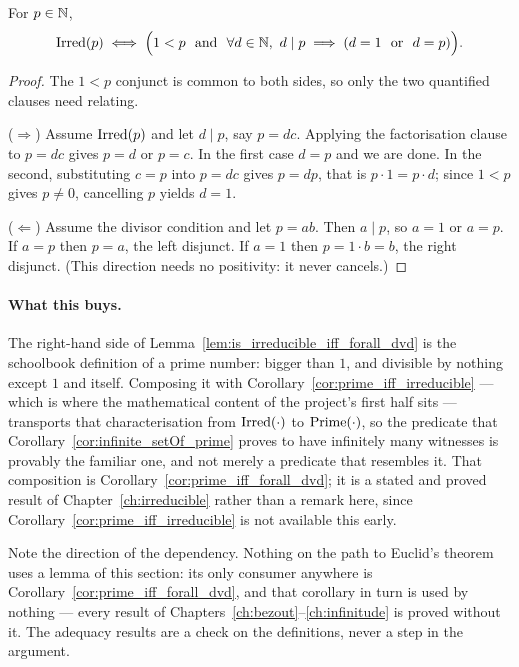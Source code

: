 \begin{lemma}
  \leanok
  \label{lem:is_irreducible_iff_forall_dvd}
  For $p \in \mathbb{N}$,
  \[
    \Irr{p} \iff \Bigl(1 < p \ \text{ and }\ \forall d \in \NN,\
      d \mid p \implies (d = 1 \ \text{ or }\ d = p)\Bigr).
  \]
\end{lemma}
\begin{proof}
  \leanok
  The $1 < p$ conjunct is common to both sides, so only the two quantified
  clauses need relating.

  ($\Rightarrow$) Assume $\mathrm{Irred}(p)$ and let $d \mid p$, say $p = dc$. Applying
  the factorisation clause to $p = dc$ gives $p = d$ or $p = c$. In the first
  case $d = p$ and we are done. In the second, substituting $c = p$ into
  $p = dc$ gives $p = dp$, that is $p \cdot 1 = p \cdot d$; since $1 < p$ gives
  $p \neq 0$, cancelling $p$ yields $d = 1$.

  ($\Leftarrow$) Assume the divisor condition and let $p = ab$. Then $a \mid p$,
  so $a = 1$ or $a = p$. If $a = p$ then $p = a$, the left disjunct. If $a = 1$
  then $p = 1 \cdot b = b$, the right disjunct. (This direction needs no
  positivity: it never cancels.)
\end{proof}

\paragraph{What this buys.} The right-hand side of
Lemma~\ref{lem:is_irreducible_iff_forall_dvd} is the schoolbook definition of a
prime number: bigger than $1$, and divisible by nothing except $1$ and itself.
Composing it with Corollary~\ref{cor:prime_iff_irreducible} --- which is where
the mathematical content of the project's first half sits --- transports that
characterisation from $\mathrm{Irred}(\cdot)$ to $\mathrm{Prime}(\cdot)$, so the predicate that
Corollary~\ref{cor:infinite_setOf_prime} proves to have infinitely many
witnesses is provably the familiar one, and not merely a predicate that
resembles it. That composition is
Corollary~\ref{cor:prime_iff_forall_dvd}; it is a stated and proved result of
Chapter~\ref{ch:irreducible} rather than a remark here, since
Corollary~\ref{cor:prime_iff_irreducible} is not available this early.

Note the direction of the dependency. Nothing on the path to Euclid's theorem
uses a lemma of this section: its only consumer anywhere is
Corollary~\ref{cor:prime_iff_forall_dvd}, and that corollary in turn is used by
nothing --- every result of
Chapters~\ref{ch:bezout}--\ref{ch:infinitude} is proved without it. The adequacy
results are a check on the definitions, never a step in the argument.
